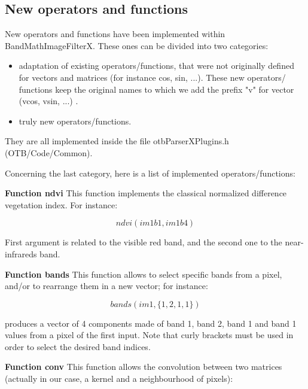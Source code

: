 \subsection{New operators and functions}\label{ssec:operators}

New operators and functions have been implemented within BandMathImageFilterX. These ones can be divided into two categories:

\begin{itemize}
\item adaptation of existing operators/functions, that were not originally defined for vectors and matrices (for instance cos, sin, ...). These new operators/ functions keep the original names to which we add the prefix "v" for vector (vcos, vsin, ...) .
\item truly new operators/functions.
\end{itemize}

They are all implemented inside the file otbParserXPlugins.h  (OTB/Code/Common).

Concerning the last category, here is a list of implemented operators/functions:

\textbf{Function ndvi} \newline
This function implements the classical normalized difference vegetation index. For instance:

\begin{equation}
	ndvi(im1b1,im1b4)
\end{equation}

First argument is related to the visible red band, and the second one to the near-infrareds band. 

\textbf{Function bands} \newline
This function allows to select specific bands from a pixel, and/or to rearrange them in a new vector; for instance:

\begin{equation}
  bands(im1,\{1,2,1,1\})
\end{equation}

produces a vector of 4 components made of band 1, band 2, band 1 and band 1 values from a pixel of the first input. Note that curly brackets must be used in order to select the desired band indices.

\textbf{Function conv } \newline
This function allows the convolution between two matrices (actually in our case, a kernel and a neighbourhood of pixels):


